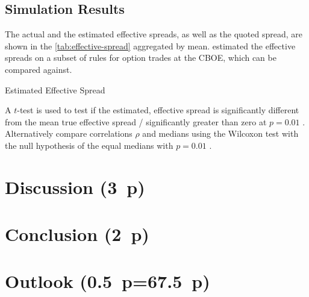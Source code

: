 \subsection{Simulation Results}\label{sec:simulation-results}

The actual and the estimated effective spreads, as well as the quoted spread, are shown in the \cref{tab:effective-spread} aggregated by mean. \textcite[][896--897]{savickasInferringDirectionOption2003} estimated the effective spreads on a subset of rules for option trades at the \gls{CBOE}, which can be compared against.

\begin{table}[H]
    \centering
    
    \caption[Estimated Effective Spread]{Estimated Effective Spread}
    \label{tab:effective-spread}
\end{table}

A $t$-test is used to test if the estimated, effective spread is significantly different from the mean true effective spread / significantly greater than zero at $p=0.01$ \autocite[cp.][570]{finucaneDirectTestMethods2000}. Alternatively compare correlations $\rho$ and medians using the Wilcoxon test with the null hypothesis of the equal medians with $p=0.01$ \autocite[cp.][12]{theissenTestAccuracyLee2000}.

\newpage
\section{Discussion (3~p)}\label{sec:discussion}

\newpage
\section{Conclusion (2~p)}\label{sec:conclusion}

\newpage
\section{Outlook (0.5~p=67.5~p)}\label{sec:outlook}

